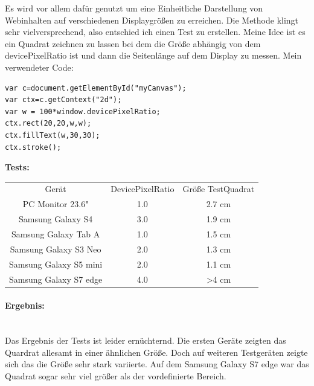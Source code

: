 Es wird vor allem dafür genutzt um eine Einheitliche Darstellung von Webinhalten auf verschiedenen Displaygrößen zu erreichen.
\newline
Die Methode klingt sehr vielversprechend, also entschied ich einen Test zu erstellen. Meine Idee ist es ein Quadrat zeichnen zu lassen bei dem die Größe abhängig von dem devicePixelRatio ist und dann die Seitenlänge auf dem Display zu messen.
Mein verwendeter Code:
\begin{lstlisting}
var c=document.getElementById("myCanvas");
var ctx=c.getContext("2d");
var w = 100*window.devicePixelRatio;
ctx.rect(20,20,w,w);
ctx.fillText(w,30,30); 
ctx.stroke(); 
\end{lstlisting}

\textbf{Tests:}
\newline
\begin{tabular}{ccc}
	Gerät                 & DevicePixelRatio & Größe TestQuadrat \\
	PC Monitor 23.6"       & 1.0              & 2.7 cm              \\
	Samsung Galaxy S4      & 3.0              & 1.9 cm              \\
	Samsung Galaxy Tab A   & 1.0              & 1.5 cm              \\
	Samsung Galaxy S3 Neo  & 2.0              & 1.3 cm              \\
	Samsung Galaxy S5 mini & 2.0              & 1.1 cm              \\
	Samsung Galaxy S7 edge & 4.0              & >4 cm               \\
\end{tabular}
\paragraph{Ergebnis:}
\mbox{}\\
Das Ergebnis der Tests ist leider ernüchternd. Die ersten Geräte zeigten das Quardrat allesamt in einer ähnlichen Größe. Doch auf weiteren Testgeräten zeigte sich das die Größe sehr stark variierte. Auf dem Samsung Galaxy S7 edge war das Quadrat sogar sehr viel größer als der vordefinierte Bereich.
\newpage
